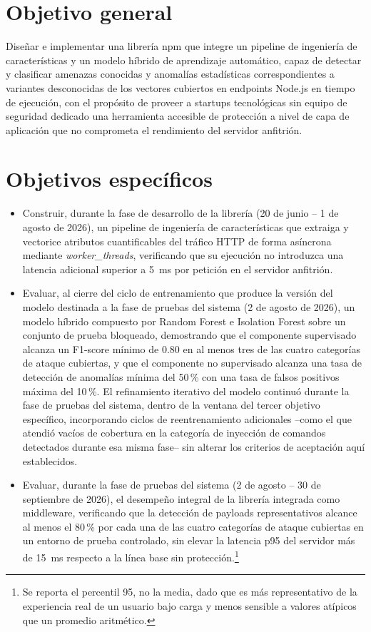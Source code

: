 \section{Objetivo general}
Diseñar e implementar una librería npm que integre un pipeline de ingeniería de características y un modelo híbrido de aprendizaje automático, capaz de detectar y clasificar amenazas conocidas y anomalías estadísticas correspondientes a variantes desconocidas de los vectores cubiertos en endpoints Node.js en tiempo de ejecución, con el propósito de proveer a startups tecnológicas sin equipo de seguridad dedicado una herramienta accesible de protección a nivel de capa de aplicación que no comprometa el rendimiento del servidor anfitrión.

\section{Objetivos específicos}
\begin{itemize}

\item Construir, durante la fase de desarrollo de la librería (20 de junio -- 1 de agosto de 2026), un pipeline de ingeniería de características que extraiga y vectorice atributos cuantificables del tráfico HTTP de forma asíncrona mediante \textit{worker\_threads}, verificando que su ejecución no introduzca una latencia adicional superior a 5~ms por petición en el servidor anfitrión.

\item Evaluar, al cierre del ciclo de entrenamiento que produce la versión del modelo destinada a la fase de pruebas del sistema (2 de agosto de 2026), un modelo híbrido compuesto por Random Forest e Isolation Forest sobre un conjunto de prueba bloqueado, demostrando que el componente supervisado alcanza un F1-score mínimo de 0.80 en al menos tres de las cuatro categorías de ataque cubiertas, y que el componente no supervisado alcanza una tasa de detección de anomalías mínima del 50\,\% con una tasa de falsos positivos máxima del 10\,\%. El refinamiento iterativo del modelo continuó durante la fase de pruebas del sistema, dentro de la ventana del tercer objetivo específico, incorporando ciclos de reentrenamiento adicionales --como el que atendió vacíos de cobertura en la categoría de inyección de comandos detectados durante esa misma fase-- sin alterar los criterios de aceptación aquí establecidos.

\item Evaluar, durante la fase de pruebas del sistema (2 de agosto -- 30 de septiembre de 2026), el desempeño integral de la librería integrada como middleware, verificando que la detección de payloads representativos alcance al menos el 80\,\% por cada una de las cuatro categorías de ataque cubiertas en un entorno de prueba controlado, sin elevar la latencia p95 del servidor más de 15~ms respecto a la línea base sin protección.\footnote{Se reporta el percentil 95, no la media, dado que es más representativo de la experiencia real de un usuario bajo carga y menos sensible a valores atípicos que un promedio aritmético.}

\end{itemize}
